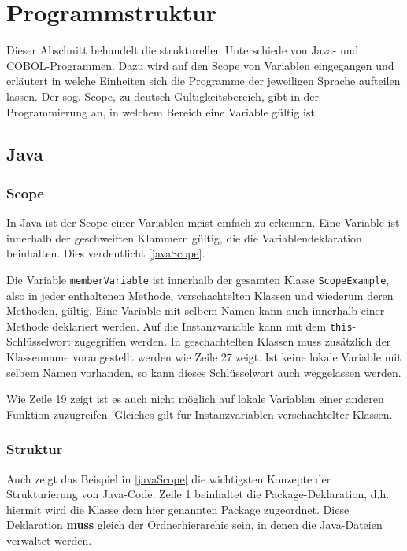 \section{Programmstruktur}\label{sec:scope}
Dieser Abschnitt behandelt die strukturellen Unterschiede von Java- und COBOL-Programmen. Dazu wird auf den Scope von Variablen eingegangen und erläutert in welche Einheiten sich die Programme der jeweiligen Sprache aufteilen lassen. Der sog. Scope, zu deutsch Gültigkeitsbereich, gibt in der Programmierung an, in welchem Bereich eine Variable gültig ist.
\subsection*{Java}
\subsubsection*{Scope}
In Java ist der Scope einer Variablen meist einfach zu erkennen. Eine Variable ist innerhalb der geschweiften Klammern gültig, die die Variablendeklaration beinhalten. Dies verdeutlicht \autoref{javaScope}.

Die Variable \texttt{memberVariable} ist innerhalb der gesamten Klasse \texttt{ScopeExample}, also in jeder enthaltenen Methode, verschachtelten Klassen und wiederum deren Methoden, gültig. Eine Variable mit selbem Namen kann auch innerhalb einer Methode deklariert werden. Auf die Instanzvariable kann mit dem \texttt{this}-Schlüsselwort zugegriffen werden. In geschachtelten Klassen muss zusätzlich der Klassenname vorangestellt werden wie Zeile 27 zeigt.  Ist keine lokale Variable mit selbem Namen vorhanden, so kann dieses Schlüsselwort auch weggelassen werden. 

Wie Zeile 19 zeigt ist es auch nicht möglich auf lokale Variablen einer anderen Funktion zuzugreifen. Gleiches gilt für Instanzvariablen verschachtelter Klassen.

\subsubsection*{Struktur} \label{javaStructureSubsubsection}
Auch zeigt das Beispiel in \autoref{javaScope} die wichtigsten Konzepte der Strukturierung von Java-Code. Zeile 1 beinhaltet die Package-Deklaration, d.h. hiermit wird die Klasse dem hier genannten Package zugeordnet. Diese Deklaration \textbf{muss} gleich der Ordnerhierarchie sein, in denen die Java-Dateien verwaltet werden. 

